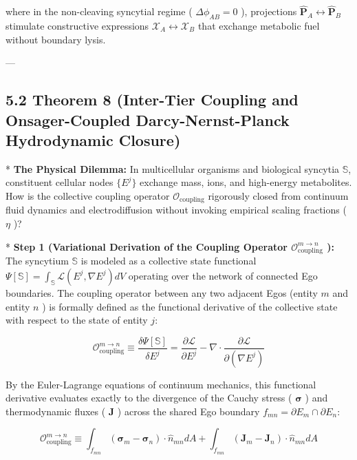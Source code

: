 \documentclass[11pt,a4paper]{article}
\theoremstyle{definition}
\theoremstyle{remark}
\begin{document}
where in the non-cleaving syncytial regime ( $\Delta \phi_{AB} = 0$ ), projections $\hat{\mathbf{P}}_A \leftrightarrow \hat{\mathbf{P}}_B$ stimulate constructive expressions $\boldsymbol{\mathcal{X}}_A \leftrightarrow \boldsymbol{\mathcal{X}}_B$ that exchange metabolic fuel without boundary lysis.

---

\subsection{5.2 Theorem 8 (Inter-Tier Coupling and Onsager-Coupled Darcy-Nernst-Planck Hydrodynamic Closure)}
* \textbf{The Physical Dilemma:} In multicellular organisms and biological syncytia $\mathbb{S}$, constituent cellular nodes $\{E^j\}$ exchange mass, ions, and high-energy metabolites. How is the collective coupling operator $\mathcal{O}_{\text{coupling}}$ rigorously closed from continuum fluid dynamics and electrodiffusion without invoking empirical scaling fractions ( $\eta$ )?

* \textbf{Step 1 (Variational Derivation of the Coupling Operator $\mathcal{O}_{\text{coupling}}^{m \to n}$ ):}
The syncytium $\mathbb{S}$ is modeled as a collective state functional $\Psi[\mathbb{S}] = \int_{\mathbb{S}} \mathcal{L}(E^j, \nabla E^j) dV$ operating over the network of connected Ego boundaries. The coupling operator between any two adjacent Egos (entity $m$ and entity $n$ ) is formally defined as the functional derivative of the collective state with respect to the state of entity $j$:


\begin{equation}
\mathcal{O}_{\text{coupling}}^{m \to n} \equiv \frac{\delta \Psi[\mathbb{S}]}{\delta E^j} = \frac{\partial \mathcal{L}}{\partial E^j} - \nabla \cdot \frac{\partial \mathcal{L}}{\partial (\nabla E^j)}
\end{equation}


By the Euler-Lagrange equations of continuum mechanics, this functional derivative evaluates exactly to the divergence of the Cauchy stress ( $\boldsymbol{\sigma}$ ) and thermodynamic fluxes ( $\mathbf{J}$ ) across the shared Ego boundary $f_{mn} = \partial E_m \cap \partial E_n$:


\begin{equation}
\boxed{\mathcal{O}_{\text{coupling}}^{m \to n} \equiv \int_{f_{mn}} (\boldsymbol{\sigma}_m - \boldsymbol{\sigma}_n) \cdot \hat{n}_{mn} dA + \int_{f_{mn}} (\mathbf{J}_m - \mathbf{J}_n) \cdot \hat{n}_{mn} dA}
\end{equation}
\end{document}
